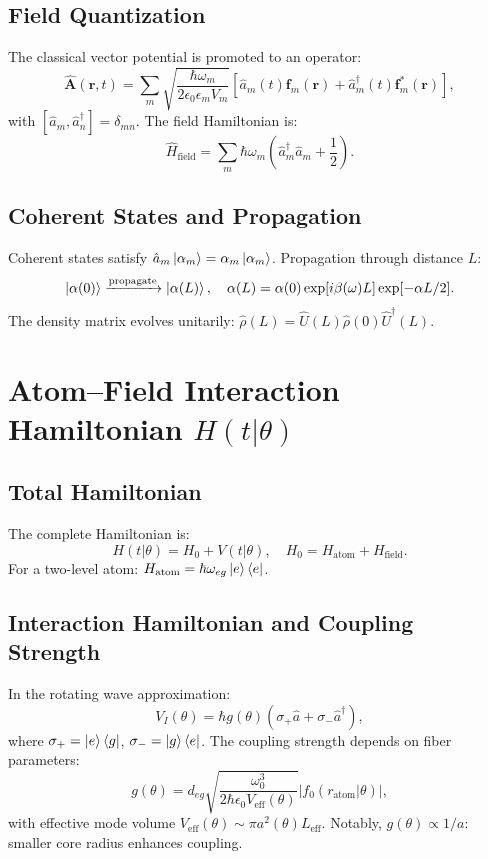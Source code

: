 \documentclass[12pt]{article}
\begin{document}
\subsection{Field Quantization}
The classical vector potential is promoted to an operator:
\begin{equation}
    \hat{\mathbf{A}}(\mathbf{r},t) = \sum_m \sqrt{\frac{\hbar\omega_m}{2\epsilon_0 \epsilon_m V_m}} \left[ \hat{a}_m(t) \mathbf{f}_m(\mathbf{r}) + \hat{a}_m^\dagger(t) \mathbf{f}_m^*(\mathbf{r}) \right],
\end{equation}
with $[\hat{a}_m, \hat{a}_n^\dagger] = \delta_{mn}$. The field Hamiltonian is:
\begin{equation}
    \hat{H}_{\text{field}} = \sum_m \hbar\omega_m \left( \hat{a}_m^\dagger \hat{a}_m + \frac{1}{2} \right).
\end{equation}

\subsection{Coherent States and Propagation}
Coherent states satisfy $\hat{a}_m \ket{\alpha_m} = \alpha_m \ket{\alpha_m}$. Propagation through distance $L$:
\begin{equation}
    \ket{\alpha(0)} \xrightarrow{\text{propagate}} \ket{\alpha(L)}, \quad \alpha(L) = \alpha(0) \exp[i\beta(\omega)L] \exp[-\alpha L/2].
\end{equation}
The density matrix evolves unitarily: $\hat{\rho}(L) = \hat{U}(L) \hat{\rho}(0) \hat{U}^\dagger(L)$.

\section{Atom--Field Interaction Hamiltonian $H(t|\theta)$}
\subsection{Total Hamiltonian}
The complete Hamiltonian is:
\begin{equation}
    H(t|\theta) = H_0 + V(t|\theta), \quad H_0 = H_{\text{atom}} + H_{\text{field}}.
\end{equation}
For a two-level atom: $H_{\text{atom}} = \hbar \omega_{eg} \ket{e}\bra{e}$.

\subsection{Interaction Hamiltonian and Coupling Strength}
In the rotating wave approximation:
\begin{equation}
    V_I(\theta) = \hbar g(\theta) \left( \sigma_+ \hat{a} + \sigma_- \hat{a}^\dagger \right),
\end{equation}
where $\sigma_+ = \ket{e}\bra{g}$, $\sigma_- = \ket{g}\bra{e}$. The coupling strength depends on fiber parameters:
\begin{equation}
    g(\theta) = d_{eg} \sqrt{\frac{\omega_0^3}{2\hbar\epsilon_0 V_{\text{eff}}(\theta)}} \left|f_0(r_{\text{atom}}|\theta)\right|,
\end{equation}
with effective mode volume $V_{\text{eff}}(\theta) \sim \pi a^2(\theta) L_{\text{eff}}$. Notably, $g(\theta) \propto 1/a$: smaller core radius enhances coupling.
\end{document}
